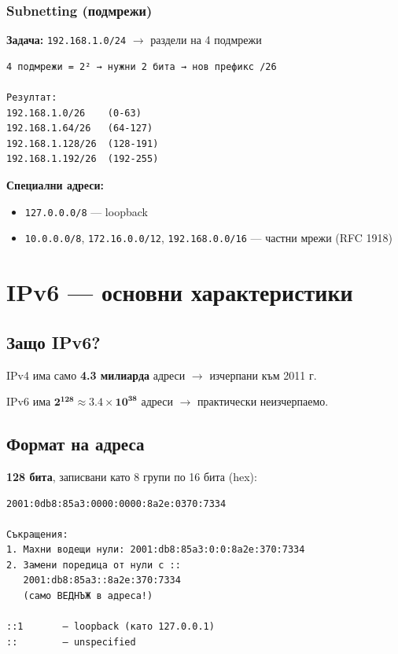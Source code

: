 \documentclass[12pt,a4paper]{article}
\begin{document}
\subsubsection{Subnetting (подмрежи)}

\textbf{Задача:} \texttt{192.168.1.0/24} $\rightarrow$ раздели на 4 подмрежи

\begin{lstlisting}
4 подмрежи = 2² → нужни 2 бита → нов префикс /26

Резултат:
192.168.1.0/26    (0-63)
192.168.1.64/26   (64-127)
192.168.1.128/26  (128-191)
192.168.1.192/26  (192-255)
\end{lstlisting}

\textbf{Специални адреси:}
\begin{itemize}
    \item \texttt{127.0.0.0/8} — loopback
    \item \texttt{10.0.0.0/8}, \texttt{172.16.0.0/12}, \texttt{192.168.0.0/16} — частни мрежи (RFC 1918)
\end{itemize}

\newpage
\section{IPv6 — основни характеристики}

\subsection{Защо IPv6?}

IPv4 има само \textbf{4.3 милиарда} адреси $\rightarrow$ изчерпани към 2011 г.

IPv6 има $\mathbf{2^{128} \approx 3.4 \times 10^{38}}$ адреси $\rightarrow$ практически неизчерпаемо.

\subsection{Формат на адреса}

\textbf{128 бита}, записвани като 8 групи по 16 бита (hex):

\begin{lstlisting}
2001:0db8:85a3:0000:0000:8a2e:0370:7334

Съкращения:
1. Махни водещи нули: 2001:db8:85a3:0:0:8a2e:370:7334
2. Замени поредица от нули с ::
   2001:db8:85a3::8a2e:370:7334
   (само ВЕДНЪЖ в адреса!)

::1       — loopback (като 127.0.0.1)
::        — unspecified
\end{lstlisting}
\end{document}
